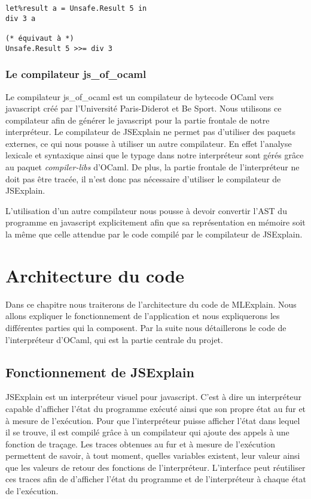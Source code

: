 \documentclass[a4paper,10pt]{report}
\begin{document}
\begin{verbatim}
let%result a = Unsafe.Result 5 in
div 3 a

(* équivaut à *)
Unsafe.Result 5 >>= div 3
\end{verbatim}	

\subsection{Le compilateur js\_of\_ocaml}
Le compilateur js\_of\_ocaml est un compilateur de bytecode OCaml vers 
javascript créé par l'Université Paris-Diderot et Be Sport. Nous utilisons ce 
compilateur afin de générer le javascript pour la partie frontale de notre 
interpréteur. Le compilateur de JSExplain ne permet pas d'utiliser des paquets 
externes, ce qui nous pousse à utiliser un autre compilateur. En effet l'analyse 
lexicale et syntaxique ainsi que le typage dans notre interpréteur sont gérés 
grâce au paquet \emph{compiler-libs} d'OCaml. De plus, la partie frontale de 
l'interpréteur ne doit pas être tracée, il n'est donc pas nécessaire d'utiliser 
le compilateur de JSExplain.

L'utilisation d'un autre compilateur nous pousse à devoir convertir l'AST du 
programme en javascript explicitement afin que sa représentation en mémoire 
soit la même que celle attendue par le code compilé par le compilateur de 
JSExplain.

\chapter{Architecture du code}
Dans ce chapitre nous traiterons de l'architecture du code de MLExplain. Nous 
allons expliquer le fonctionnement de l'application et nous expliquerons les 
différentes parties qui la composent. Par la suite nous détaillerons le code de 
l'interpréteur d'OCaml, qui est la partie centrale du projet.

\section{Fonctionnement de JSExplain}
JSExplain est un interpréteur visuel pour javascript. C'est à dire un 
interpréteur capable d'afficher l'état du programme exécuté ainsi que son 
propre état au fur et à mesure de l'exécution. Pour que l'interpréteur puisse 
afficher l'état dans lequel il se trouve, il est compilé grâce à un compilateur 
qui ajoute des appels à une fonction de traçage. Les traces obtenues au fur et 
à mesure de l'exécution permettent de savoir, à tout moment, quelles variables 
existent, leur valeur ainsi que les valeurs de retour des fonctions de 
l'interpréteur. L'interface peut réutiliser ces traces afin de d'afficher 
l'état du programme et de l'interpréteur à chaque état de l'exécution.
\end{document}
